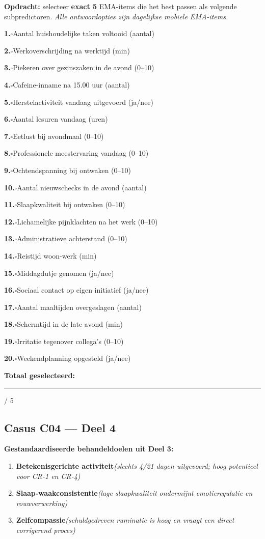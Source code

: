 \documentclass[11pt,a4paper]{article}
\newcommand{\checkitemBFS}[2]{%
\noindent\small\textbf{#1.}\hspace{0.45em}$\square$\hspace{0.4em}#2\par\vspace{0.20em}}
\begin{document}
\begin{responsebox}
\small\textbf{Opdracht:} selecteer \textbf{exact 5} EMA-items die het best passen als volgende subpredictoren.
\textit{Alle antwoordopties zijn dagelijkse mobiele EMA-items.}

\checkitemBFS{1}{Aantal huishoudelijke taken voltooid (aantal)}
\checkitemBFS{2}{Werkoverschrijding na werktijd (min)}
\checkitemBFS{3}{Piekeren over gezinszaken in de avond (0--10)}
\checkitemBFS{4}{Cafeine-inname na 15.00 uur (aantal)}
\checkitemBFS{5}{Herstelactiviteit vandaag uitgevoerd (ja/nee)}
\checkitemBFS{6}{Aantal lesuren vandaag (uren)}
\checkitemBFS{7}{Eetlust bij avondmaal (0--10)}
\checkitemBFS{8}{Professionele meestervaring vandaag (0--10)}
\checkitemBFS{9}{Ochtendspanning bij ontwaken (0--10)}
\checkitemBFS{10}{Aantal nieuwschecks in de avond (aantal)}
\checkitemBFS{11}{Slaapkwaliteit bij ontwaken (0--10)}
\checkitemBFS{12}{Lichamelijke pijnklachten na het werk (0--10)}
\checkitemBFS{13}{Administratieve achterstand (0--10)}
\checkitemBFS{14}{Reistijd woon-werk (min)}
\checkitemBFS{15}{Middagdutje genomen (ja/nee)}
\checkitemBFS{16}{Sociaal contact op eigen initiatief (ja/nee)}
\checkitemBFS{17}{Aantal maaltijden overgeslagen (aantal)}
\checkitemBFS{18}{Schermtijd in de late avond (min)}
\checkitemBFS{19}{Irritatie tegenover collega's (0--10)}
\checkitemBFS{20}{Weekendplanning opgesteld (ja/nee)}
\vspace{0.4em}
\noindent\textbf{Totaal geselecteerd:}\hspace{0.5em}\rule{1.2cm}{0.25pt}\hspace{0.2em}/ 5
\end{responsebox}

\vspace{0.6em}
\newpage
\subsection*{Casus C04 --- Deel 4}

\begin{contextbox}
\small\textbf{Gestandaardiseerde behandeldoelen uit Deel 3:}
\begin{enumerate}[topsep=2pt,itemsep=1pt,label=\arabic*.]
\item \textbf{Betekenisgerichte activiteit}\quad\textit{\small (slechts 4/21 dagen uitgevoerd; hoog potentieel voor CR-1 en CR-4)}
\item \textbf{Slaap-waakconsistentie}\quad\textit{\small (lage slaapkwaliteit ondermijnt emotieregulatie en rouwverwerking)}
\item \textbf{Zelfcompassie}\quad\textit{\small (schuldgedreven ruminatie is hoog en vraagt een direct corrigerend proces)}
\end{enumerate}
\end{contextbox}
\end{document}
